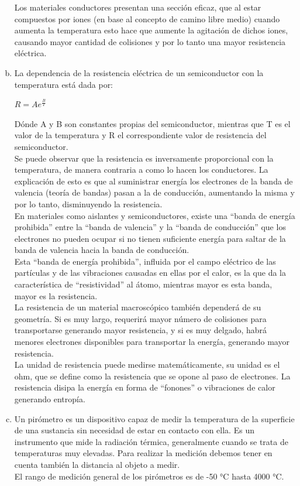 \documentclass[10pt,a4paper]{article}
\begin{document}
\begin{enumerate}[a)]
Los materiales conductores presentan una sección eficaz, que al estar compuestos por iones (en base al concepto de camino libre medio) cuando aumenta la temperatura esto hace que aumente la agitación de dichos iones, causando mayor cantidad de colisiones y por lo tanto una mayor resistencia eléctrica.

\item La dependencia de la resistencia eléctrica de un semiconductor con la temperatura está dada por:
\begin{center}
$ R = Ae^\frac{B}{T}$
\end{center}

Dónde A y B son constantes propias del semiconductor, mientras que T es el valor de la temperatura y R el correspondiente valor de resistencia del semiconductor.\\
Se puede observar que la resistencia es inversamente proporcional con la temperatura, de manera contraria a como lo hacen los conductores. La explicación de esto es que al suministrar energía los electrones de la banda de valencia (teoría de bandas) pasan a la de conducción, aumentando la misma y por lo tanto, disminuyendo la resistencia.\\

En materiales como aislantes y semiconductores, existe una “banda de energía prohibida” entre la “banda de valencia” y la “banda de conducción” que los electrones no pueden ocupar si no tienen suficiente energía para saltar de la banda de valencia hacia la banda de conducción.\\
Esta “banda de energía prohibida”, influida por el campo eléctrico de las partículas y de las vibraciones causadas en ellas por el calor, es la que da la característica de “resistividad” al átomo, mientras mayor es esta banda, mayor es la resistencia.\\
La resistencia de un material macroscópico también dependerá de su geometría. Si es muy largo, requerirá mayor número de colisiones para transportarse generando mayor resistencia, y si es muy delgado, habrá menores electrones disponibles para transportar la energía, generando mayor resistencia.\\
La unidad de resistencia puede medirse matemáticamente, su unidad es el ohm, que se define como la resistencia que se opone al paso de electrones. La resistencia disipa la energía en forma de “fonones” o vibraciones de calor generando entropía.\\

\item Un pirómetro es un dispositivo capaz de medir la temperatura de la superficie de una sustancia sin necesidad de estar en contacto con ella. Es un instrumento que mide la radiación térmica, generalmente cuando se trata de temperaturas muy elevadas. Para realizar la medición debemos tener en cuenta también la distancia al objeto a medir.\\
El rango de medición general de los pirómetros es de -50 °C hasta 4000 °C.\\


\end{enumerate}
\end{document}
